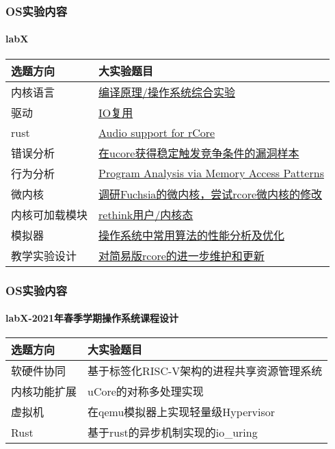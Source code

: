 \begin{frame}
	\frametitle{OS实验内容}
	\framesubtitle{labX}
	
	\begin{longtable}[]{@{}|l|l|@{}}
		\toprule
		选题方向 & 大实验题目\tabularnewline
		\midrule
		\endhead
		内核语言 &
		\href{http://os.cs.tsinghua.edu.cn/oscourse/OsTrain2019/g6}{编译原理/操作系统综合实验}\tabularnewline \hline
		驱动 &
		\href{http://os.cs.tsinghua.edu.cn/oscourse/OsTrain2019/g4}{IO复用}\tabularnewline \hline
		rust &
		\href{http://os.cs.tsinghua.edu.cn/oscourse/OS2019spring/projects/g08}{Audio
			support for rCore}\tabularnewline \hline
		错误分析 &
		\href{http://os.cs.tsinghua.edu.cn/oscourse/OS2019spring/projects/g07}{在ucore获得稳定触发竞争条件的漏洞样本}\tabularnewline \hline
		行为分析 &
		\href{http://os.cs.tsinghua.edu.cn/oscourse/OS2019spring/projects/g09}{Program
			Analysis via Memory Access Patterns}\tabularnewline \hline
		微内核 &
		\href{http://os.cs.tsinghua.edu.cn/oscourse/OsTrain2019/g1}{调研Fuchsia的微内核，尝试rcore微内核的修改}\tabularnewline \hline
		内核可加载模块 &
		\href{http://os.cs.tsinghua.edu.cn/oscourse/OsTrain2019/g5}{rethink用户/内核态}\tabularnewline \hline
		模拟器 &
		\href{http://os.cs.tsinghua.edu.cn/oscourse/OS2019spring/projects/g10}{操作系统中常用算法的性能分析及优化}\tabularnewline \hline
		教学实验设计 &
		\href{http://os.cs.tsinghua.edu.cn/oscourse/OsTrain2019/g7}{对简易版rcore的进一步维护和更新}\tabularnewline \hline
		\bottomrule
	\end{longtable}
	

\end{frame}
\begin{frame}
	\frametitle{OS实验内容}
	\framesubtitle{labX-2021年春季学期操作系统课程设计}
	
	\begin{longtable}[]{@{}|l|l|@{}}
		\toprule
		选题方向 & 大实验题目\tabularnewline
		\midrule
		\endhead
		软硬件协同 &
		基于标签化RISC-V架构的进程共享资源管理系统\tabularnewline \hline
		内核功能扩展 &
		uCore的对称多处理实现\tabularnewline \hline
		虚拟机 &
		在qemu模拟器上实现轻量级Hypervisor\tabularnewline \hline
		Rust &
		基于rust的异步机制实现的io\_uring\tabularnewline \hline
		\bottomrule
	\end{longtable}
	

\end{frame}
